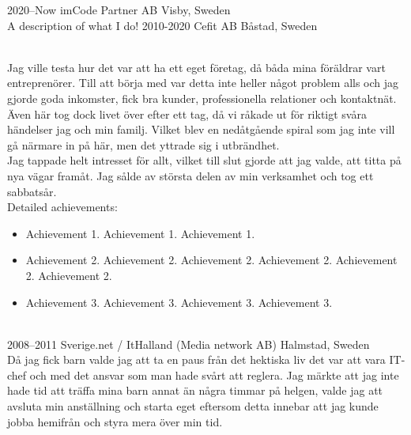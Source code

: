 \documentclass[]{cv-style}          %
\begin{document}
\begin{entrylist}
\entry
  {2020--Now}
  {imCode Partner AB}
  {Visby, Sweden}
  {\\
  A description of what I do!}
\entry
  {2010-2020}
  {Cefit AB}
  {Båstad, Sweden}
  {\\
    Jag ville testa hur det var att ha ett eget företag, då båda
    mina föräldrar vart entreprenörer. Till att börja med var detta inte
    heller något problem alls och jag gjorde goda inkomster, fick bra 
    kunder, professionella relationer och kontaktnät.\\

    Även här tog dock livet över efter ett tag, då vi råkade ut för riktigt
    svåra händelser jag och min familj. Vilket blev en nedåtgående spiral
    som jag inte vill gå närmare in på här, men det yttrade sig i utbrändhet.\\
    
    Jag tappade helt intresset för allt, vilket till slut gjorde att jag
    valde, att titta på nya vägar framåt. Jag sålde av största delen av 
    min verksamhet och tog ett sabbatsår.\\

    Detailed achievements:
  \begin{itemize}
    \item Achievement 1. Achievement 1. Achievement 1. 
    \item Achievement 2. Achievement 2. Achievement 2. Achievement 2. Achievement 2. Achievement 2.
    \item Achievement 3. Achievement 3. Achievement 3. Achievement 3.  
  \end{itemize}}\\
\entry
  {2008--2011}
  {Sverige.net / ItHalland (Media network AB)}
  {Halmstad, Sweden}
  {\\
    Då jag fick barn valde jag att ta en paus från det hektiska liv det var 
    att vara IT-chef och med det ansvar som man hade svårt att reglera. 
    Jag märkte att jag inte hade tid att träffa mina barn annat än några
    timmar på helgen, valde jag att avsluta min anställning och starta
    eget eftersom detta innebar att jag kunde jobba hemifrån och styra
    mera över min tid.\\

}
\end{entrylist}
\end{document}
